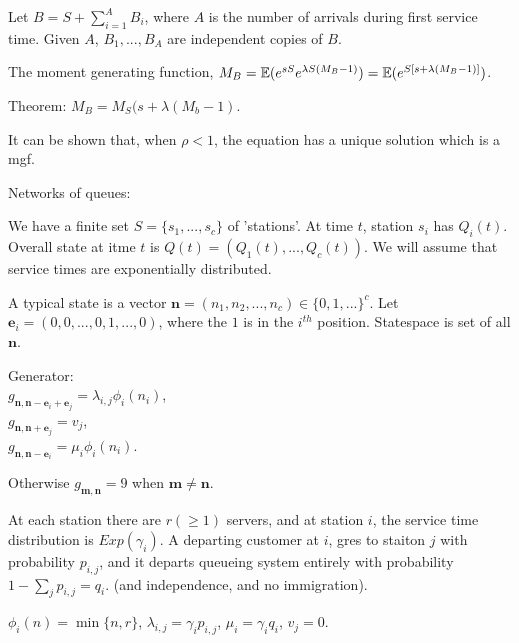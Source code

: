 \documentclass[a4paper]{article}
\begin{document}
Let $B = S + \sum_{i=1}^A B_i$, where $A$ is the number of arrivals during first service time. Given $A$, $B_1,...,B_A$ are independent copies of $B$.

The moment generating function, $M_B = \mathbb{E}(e^{sS} e^{\lambda S (M_B-1)}) = \mathbb{E}(e^{S[s+\lambda(M_B-1)]})$.

Theorem: $M_B = M_S (s+\lambda(M_b-1)$.

It can be shown that, when $\rho < 1$, the equation has a unique solution which is a mgf.

Networks of queues:

We have a finite set $S = \{s_1,...,s_c\}$ of 'stations'. At time $t$, station $s_i$ has $Q_i(t)$. Overall state at itme $t$ is $Q(t) = (Q_1(t), ..., Q_c(t))$. We will assume that service times are exponentially distributed.

A typical state is a vector $\mathbf{n} = (n_1,n_2,...,n_c) \in \{0,1,...\}^c$. Let $\mathbf{e}_i = (0,0,...,0,1,...,0)$, where the $1$ is in the $i^{th}$ position. Statespace is set of all $\mathbf{n}$.

Generator:\\
$g_{\mathbf{n},\mathbf{n}-\mathbf{e}_i+\mathbf{e}_j} = \lambda_{i,j} \phi_i(n_i)$,\\
$g_{\mathbf{n},\mathbf{n}+\mathbf{e}_j} = v_j$,\\
$g_{\mathbf{n},\mathbf{n}-\mathbf{e}_i} = \mu_i \phi_i(n_i)$.

Otherwise $g_{\mathbf{m},\mathbf{n}} = 9$ when $\mathbf{m} \neq \mathbf{n}$.

\begin{eg}
At each station there are $r (\geq 1)$ servers, and at station $i$, the service time distribution is $Exp(\gamma_i)$. A departing customer at $i$, gres to staiton $j$ with probability $p_{i,j}$, and it departs queueing system entirely with probability $1-\sum_{j} p_{i,j} = q_i$. (and independence, and no immigration).

$\phi_i(n) = \min\{n,r\}$, $\lambda_{i,j} = \gamma_i p_{i,j}$, $\mu_i = \gamma_i q_i$, $v_j = 0$.
\end{eg}

\end{document}
